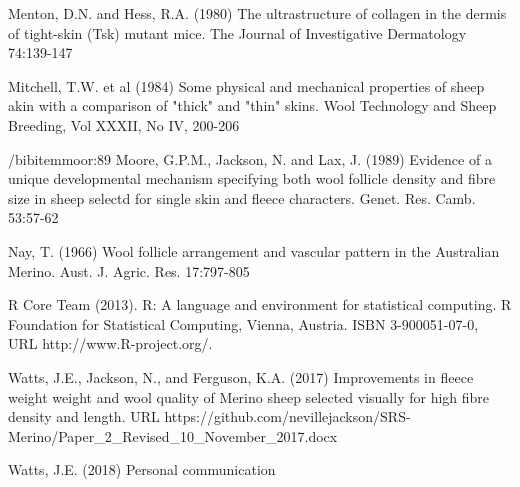 \documentclass[titlepage]{article}  %
\begin{document}
\begin{thebibliography}{99}
Menton, D.N. and Hess, R.A. (1980) The ultrastructure of collagen in the dermis of tight-skin (Tsk) mutant mice. The Journal of Investigative Dermatology 74:139-147

Mitchell, T.W. et al (1984) Some physical and mechanical properties of sheep akin with a comparison of "thick" and "thin" skins. Wool Technology and Sheep Breeding, Vol XXXII, No IV, 200-206

/bibitem{moor:89}
Moore, G.P.M., Jackson, N. and Lax, J. (1989) Evidence of a unique developmental mechanism specifying both wool follicle density and fibre size in sheep selectd for single skin and fleece characters. Genet. Res. Camb. 53:57-62

Nay, T. (1966) Wool follicle arrangement and vascular pattern in the Australian Merino. Aust. J. Agric. Res. 17:797-805

R Core Team (2013). R: A language and environment for statistical
  computing. R Foundation for Statistical Computing, Vienna, Austria.
  ISBN 3-900051-07-0, URL http://www.R-project.org/.


Watts, J.E., Jackson, N., and Ferguson, K.A. (2017) Improvements in fleece weight weight and wool quality of Merino sheep selected visually for high fibre density and length. URL https://github.com/nevillejackson/SRS-Merino/Paper\_2\_Revised\_10\_November\_2017.docx 

Watts, J.E. (2018) Personal communication

\end{thebibliography}
\end{document}
